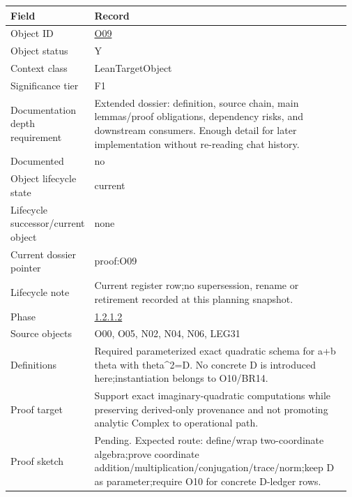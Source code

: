 \begin{longtable}{L{0.16\linewidth} L{0.81\linewidth}}
\hline
\textbf{Field} & \textbf{Record}\\
\hline
Object ID & \hyperlink{object-row-O09}{O09}\\
\hline\addlinespace[0.20em]
Object status & Y\\
\hline\addlinespace[0.20em]
Context class & LeanTargetObject\\
\hline\addlinespace[0.20em]
Significance tier & F1\\
\hline\addlinespace[0.20em]
Documentation depth requirement & Extended dossier: definition, source chain, main lemmas/\allowbreak{}proof obligations, dependency risks, and downstream consumers. Enough detail for later implementation without re-reading chat history.\\
\hline\addlinespace[0.20em]
Documented & no\\
\hline\addlinespace[0.20em]
Object lifecycle state & current\\
\hline\addlinespace[0.20em]
Lifecycle successor/\allowbreak{}current object & none\\
\hline\addlinespace[0.20em]
Current dossier pointer & proof:O09\\
\hline\addlinespace[0.20em]
Lifecycle note & Current register row;\newline no supersession, rename or retirement recorded at this planning snapshot.\\
\hline\addlinespace[0.20em]
Phase & \hyperlink{phase-row-1-2-1-2}{1.2.1.2}\\
\hline\addlinespace[0.20em]
Source objects & O00, O05, N02, N04, N06, LEG31\\
\hline\addlinespace[0.20em]
Definitions & Required parameterized exact quadratic schema for a+b theta with theta\textasciicircum{}2=D. No concrete D is introduced here;\newline instantiation belongs to O10/\allowbreak{}BR14.\\
\hline\addlinespace[0.20em]
Proof target & Support exact imaginary-quadratic computations while preserving derived-only provenance and not promoting analytic Complex to operational path.\\
\hline\addlinespace[0.20em]
Proof sketch & Pending. Expected route: define/\allowbreak{}wrap two-coordinate algebra;\newline prove coordinate addition/\allowbreak{}multiplication/\allowbreak{}conjugation/\allowbreak{}trace/\allowbreak{}norm;\newline keep D as parameter;\newline require O10 for concrete D-ledger rows.\\

\end{longtable}
